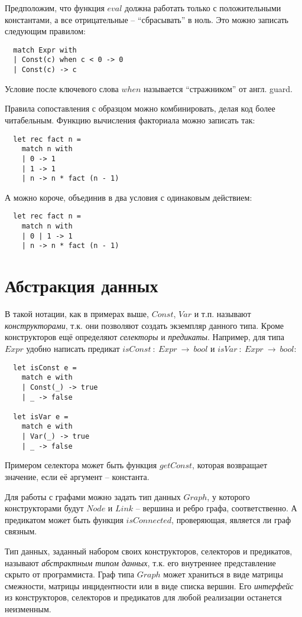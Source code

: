 \documentclass[a4paper,11pt]{article}
\begin{document}
Предположим, что функция $eval$ должна работать только с положительными
константами, а все отрицательные -- ``сбрасывать'' в ноль. Это можно записать
следующим правилом:
\begin{lstlisting}
  match Expr with
  | Const(c) when c < 0 -> 0
  | Const(c) -> c
\end{lstlisting}
Условие после ключевого слова $when$ называется ``стражником'' от англ. guard.

Правила сопоставления с образцом можно комбинировать, делая код более
читабельным. Функцию вычисления факториала можно записать так:
\begin{lstlisting}
  let rec fact n =
    match n with
    | 0 -> 1
    | 1 -> 1
    | n -> n * fact (n - 1)
\end{lstlisting}
А можно короче, объединив в два условия с одинаковым действием:
\begin{lstlisting}
  let rec fact n =
    match n with
    | 0 | 1 -> 1
    | n -> n * fact (n - 1)
\end{lstlisting}

\section{Абстракция данных}
В такой нотации, как в примерах выше, $Const$, $Var$ и т.п. называют 
\emph{конструкторами}, т.к. они позволяют создать экземпляр данного типа. Кроме
конструкторов ещё определяют \emph{селекторы} и \emph{предикаты}. Например,
для типа $Expr$ удобно написать предикат $isConst~:~Expr~\rightarrow~bool$ и
$isVar~:~Expr~\rightarrow~bool$:
\begin{lstlisting}
  let isConst e =
    match e with
    | Const(_) -> true
    | _ -> false

  let isVar e =
    match e with
    | Var(_) -> true
    | _ -> false
\end{lstlisting}

Примером селектора может быть функция $getConst$, которая возвращает значение,
если её аргумент -- константа.

Для работы с графами можно задать тип данных $Graph$, у которого конструкторами
будут $Node$ и $Link$ -- вершина и ребро графа, соответственно. А предикатом
может быть функция $isConnected$, проверяющая, является ли граф связным.

Тип данных, заданный набором своих конструкторов, селекторов и предикатов,
называют \emph{абстрактным типом данных}, т.к. его внутреннее представление
скрыто от программиста. Граф типа $Graph$ может храниться в виде матрицы
смежности, матрицы инцидентности или в виде списка вершин. Его \emph{интерфейс}
из конструкторов, селекторов и предикатов для любой реализации останется 
неизменным.
\end{document}
